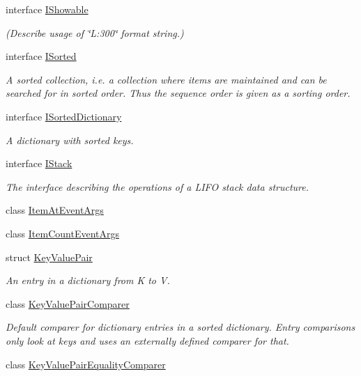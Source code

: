 \begin{DoxyCompactItemize}
interface \hyperlink{interface_c5_1_1_i_showable}{I\+Showable}
\begin{DoxyCompactList}\small\item\em {\itshape (Describe usage of \char`\"{}\+L\+:300\char`\"{} format string.)} \end{DoxyCompactList}\item 
interface \hyperlink{interface_c5_1_1_i_sorted}{I\+Sorted}
\begin{DoxyCompactList}\small\item\em A sorted collection, i.\+e. a collection where items are maintained and can be searched for in sorted order. Thus the sequence order is given as a sorting order. \end{DoxyCompactList}\item 
interface \hyperlink{interface_c5_1_1_i_sorted_dictionary}{I\+Sorted\+Dictionary}
\begin{DoxyCompactList}\small\item\em A dictionary with sorted keys. \end{DoxyCompactList}\item 
interface \hyperlink{interface_c5_1_1_i_stack}{I\+Stack}
\begin{DoxyCompactList}\small\item\em The interface describing the operations of a L\+I\+F\+O stack data structure. \end{DoxyCompactList}\item 
class \hyperlink{class_c5_1_1_item_at_event_args}{Item\+At\+Event\+Args}
\item 
class \hyperlink{class_c5_1_1_item_count_event_args}{Item\+Count\+Event\+Args}
\item 
struct \hyperlink{struct_c5_1_1_key_value_pair}{Key\+Value\+Pair}
\begin{DoxyCompactList}\small\item\em An entry in a dictionary from K to V. \end{DoxyCompactList}\item 
class \hyperlink{class_c5_1_1_key_value_pair_comparer}{Key\+Value\+Pair\+Comparer}
\begin{DoxyCompactList}\small\item\em Default comparer for dictionary entries in a sorted dictionary. Entry comparisons only look at keys and uses an externally defined comparer for that. \end{DoxyCompactList}\item 
class \hyperlink{class_c5_1_1_key_value_pair_equality_comparer}{Key\+Value\+Pair\+Equality\+Comparer}

\end{DoxyCompactItemize}

